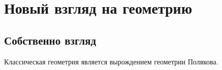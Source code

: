 \documentclass[11pt]{article}
\def\p{\partial}
\theoremstyle{remark}
\theoremstyle{definition}
\begin{document}

\section{Новый взгляд на геометрию}
\subsection{Собственно взгляд}

Классическая геометрия является вырождением геометрии Полякова.
\end{document}
